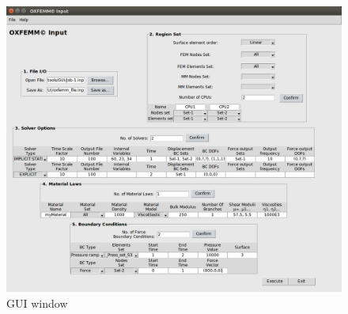 \documentclass[oneside,11pt,times]{book}
\begin{document}
\begin{figure}[h!]
    \centering
    \includegraphics[width=1\textwidth]{imgs/UserManual/GUI.png}
    \caption{GUI window}
    \label{fig:GUIWindow}
\end{figure}
\end{document}
